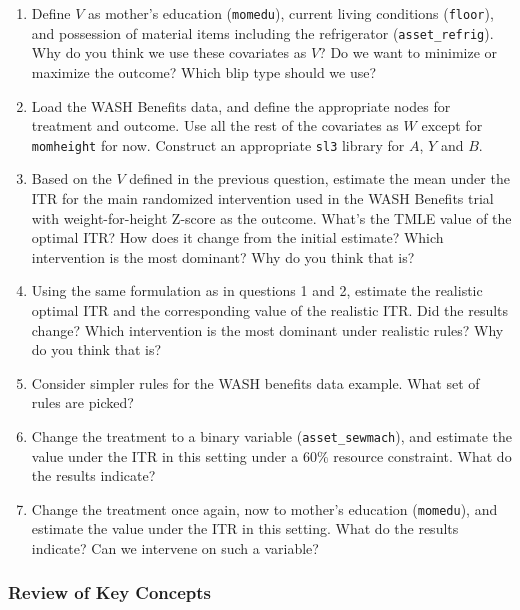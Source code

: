 \documentclass[12pt, krantz2,]{krantz}
\theoremstyle{definition}
\theoremstyle{definition}
\theoremstyle{definition}
\newcommand{\1}{\mathbbm{1}}
\begin{document}
\begin{enumerate}
\def\labelenumi{\arabic{enumi}.}
\item
  Define \(V\) as mother's education (\texttt{momedu}), current living conditions (\texttt{floor}),
  and possession of material items including the refrigerator (\texttt{asset\_refrig}).
  Why do you think we use these covariates as \(V\)? Do we want to minimize or
  maximize the outcome? Which blip type should we use?
\item
  Load the WASH Benefits data, and define the appropriate nodes for treatment
  and outcome. Use all the rest of the covariates as \(W\) except for
  \texttt{momheight} for now. Construct an appropriate \texttt{sl3} library for \(A\), \(Y\) and
  \(B\).
\item
  Based on the \(V\) defined in the previous question, estimate the mean under
  the ITR for the main randomized intervention used in the WASH Benefits trial
  with weight-for-height Z-score as the outcome. What's the TMLE value of the
  optimal ITR? How does it change from the initial estimate? Which
  intervention is the most dominant? Why do you think that is?
\item
  Using the same formulation as in questions 1 and 2, estimate the realistic
  optimal ITR and the corresponding value of the realistic ITR. Did the results
  change? Which intervention is the most dominant under realistic rules? Why do
  you think that is?
\item
  Consider simpler rules for the WASH benefits data example. What set of rules
  are picked?
\item
  Change the treatment to a binary variable (\texttt{asset\_sewmach}), and estimate the
  value under the ITR in this setting under a \(60\%\) resource constraint. What
  do the results indicate?
\item
  Change the treatment once again, now to mother's education (\texttt{momedu}), and
  estimate the value under the ITR in this setting. What do the results
  indicate? Can we intervene on such a variable?
\end{enumerate}

\hypertarget{review-of-key-concepts-1}{%
\subsubsection{Review of Key Concepts}\label{review-of-key-concepts-1}}
\end{document}
